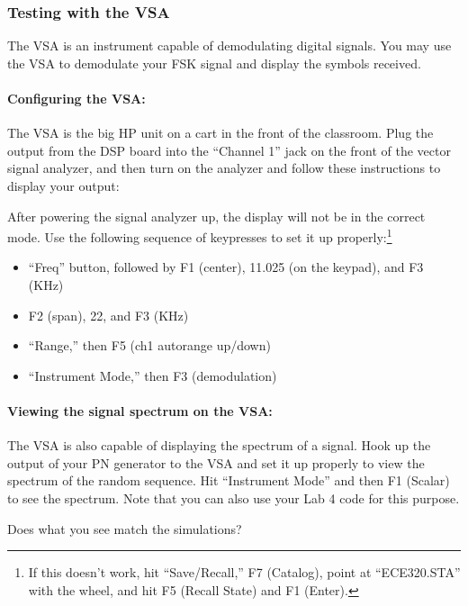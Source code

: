 \subsubsection{Testing with the VSA}

The VSA is an instrument capable of 
demodulating digital signals. You may use  
the VSA to demodulate your FSK signal and display the 
symbols received.

\paragraph{Configuring the VSA:}  
The VSA is the big HP unit on a cart in the front of the
classroom. Plug the output from the DSP board into the ``Channel 1'' jack
on the front of the vector signal analyzer, and then turn on the
analyzer and follow these instructions to display your output:

After powering the signal analyzer up, the display will not be in the
correct mode. Use the following sequence of keypresses to set it up
properly:\footnote{If this doesn't work, hit ``Save/Recall,'' F7 (Catalog), 
point at ``ECE320.STA'' with the wheel, and hit F5 (Recall State) and
F1 (Enter).}

\begin{itemize}
\item ``Freq'' button, followed by F1 (center), 11.025 (on the keypad), and F3 (KHz) 
\item F2 (span), 22, and F3 (KHz) 
\item ``Range,'' then F5 (ch1 autorange up/down)
\item ``Instrument Mode,'' then F3 (demodulation) 
\end{itemize}

\paragraph{Viewing the signal spectrum on the VSA: }
The VSA is also capable of displaying the spectrum of a signal.  
Hook up the output of your PN generator to the VSA and set it up 
properly to view the spectrum of the random sequence.  Hit ``Instrument
Mode'' and then F1 (Scalar) to see the spectrum.  Note that you
can also use your Lab 4 code for this purpose.

Does what you see match the \matlab simulations?

